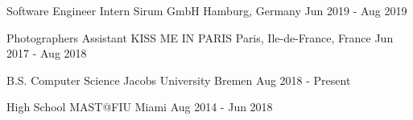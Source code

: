 \documentclass[11pt, a4paper]{awesome-cv}
\begin{document}
\begin{cventries}
  \cventry
    {Software Engineer Intern} %
    {Sirum GmbH} %
    {Hamburg, Germany} %
    {Jun 2019 - Aug 2019} %
    {
      \begin{cvitems} %
      \end{cvitems}
    }

  \cventry
    {Photographers Assistant} %
    {KISS ME IN PARIS} %
    {Paris, Ile-de-France, France} %
    {Jun 2017 - Aug 2018} %
    {
      \begin{cvitems} %
      \end{cvitems}
    }

\end{cventries}


\begin{cventries}

  \cventry
    {B.S. Computer Science} %
    {Jacobs University} %
    {Bremen} %
    {Aug 2018 - Present} %
    {
      \begin{cvitems} %
      \end{cvitems}
    }

  \cventry
    {High School} %
    {MAST@FIU} %
    {Miami} %
    {Aug 2014 - Jun 2018} %
    {
      \begin{cvitems} %
      \end{cvitems}
    }

\end{cventries}

\end{document}
